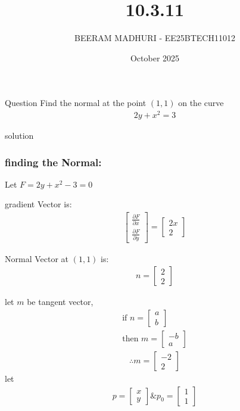 \documentclass{beamer}
\title %
{10.3.11}
\date{October  2025}
\author %
{BEERAM MADHURI - EE25BTECH11012}
\begin{document}
\frame{\titlepage}
\begin{frame}{Question}
Find the normal at the point $(1,1)$ on the curve
\begin{align}
2y + x^2 = 3
\end{align}
\end{frame}

\begin{frame}{solution}
    \frametitle{finding the Normal:}
Let $F = 2y + x^2 - 3 = 0$

gradient Vector is:
\begin{align}
\begin{bmatrix}
\frac{\partial F}{\partial x} \\
\frac{\partial F}{\partial y}
\end{bmatrix} = \begin{bmatrix}
2x \\
2
\end{bmatrix}
\end{align}

Normal Vector at $(1,1)$ is:
\begin{align}
n = \begin{bmatrix}
2 \\
2
\end{bmatrix}
\end{align}
\end{frame}
\begin{frame}
let $m$ be tangent vector,
\begin{align}
\text{if } n = \begin{bmatrix}
a \\
b
\end{bmatrix}\\
\text{then } m = \begin{bmatrix}
-b \\
a
\end{bmatrix}
\end{align}
\begin{align}
\therefore m = \begin{bmatrix}
-2 \\
2
\end{bmatrix}
\end{align}
let 
\begin{align}
p = \begin{bmatrix}
x \\
y
\end{bmatrix} \& p_0 = \begin{bmatrix}
1 \\
1
\end{bmatrix}
\end{align}
\end{frame}
\end{document}

